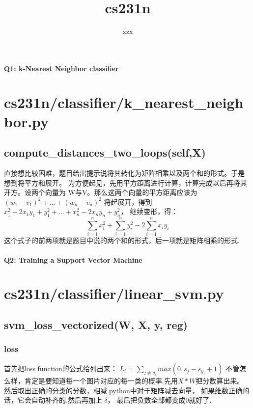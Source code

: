 \documentclass[fontset = none]{ctexart}
\author{\CJKfontspec{KaiTi} xzx}
\title{cs231n}
\begin{document}
\maketitle
\paragraph{Q1: k-Nearest Neighbor classifier}

\section{cs231n/classifier/k\_nearest\_neighbor.py}
\subsection{compute\_distances\_two\_loops(self,X) }
直接想比较困难，题目给出提示说将其转化为矩阵相乘以及两个和的形式。于是
想到将平方和展开。
为方便起见，先用平方距离进行计算，计算完成以后再将其开方。设两个向量为
W与V。那么这两个向量的平方距离应该为 $(w_1 - v_1)^2 + ... + (w_n-v_n)^2$
将起展开，得到 $x_1^2-2x_{1}y_1+y_1^2 + ... +x_n^2-2x_{n}y_n+y_n^2$，
继续变形，得：
$$\sum_{i=1}^{n}{x_i^2} +
\sum_{i=1}^{n}{y_i^2} -2\sum_{i=1}^n{x_{i}y_i}$$
这个式子的前两项就是题目中说的两个和的形式，后一项就是矩阵相乘的形式.

\paragraph{Q2: Training a Support Vector Machine}

\section{cs231n/classifier/linear\_svm.py}
\subsection{svm\_loss\_vectorized(W, X, y, reg)}
\subsubsection{loss}
首先把loss function的公式给列出来：
 $L_i = \sum_{j\neq y_i}max(0, s_j - s_{y_i} + 1)$
不管怎么样，肯定是要知道每一个图片对应的每一类的概率.先用$X * W$把分数算出来。
然后取出正确的分类的分数，相减.python中对于矩阵减去向量，
如果维数正确的话，它会自动补齐的.然后再加上 $\delta$，
最后把负数全部都变成0就好了.
\end{document}
